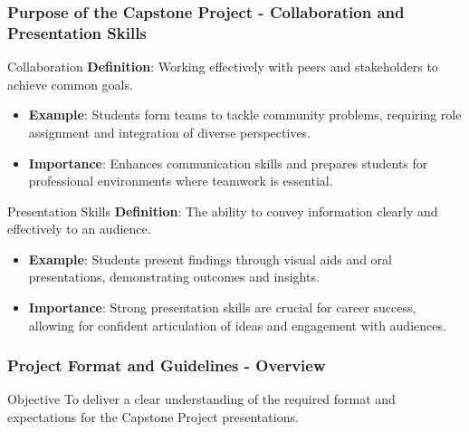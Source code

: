 \documentclass{beamer}
\begin{document}
\begin{frame}[fragile]
    \frametitle{Purpose of the Capstone Project - Collaboration and Presentation Skills}
    \begin{block}{Collaboration}
        \textbf{Definition}: Working effectively with peers and stakeholders to achieve common goals.
    \end{block}
    \begin{itemize}
        \item \textbf{Example}: Students form teams to tackle community problems, requiring role assignment and integration of diverse perspectives.
        \item \textbf{Importance}: Enhances communication skills and prepares students for professional environments where teamwork is essential.
    \end{itemize}
    
    \begin{block}{Presentation Skills}
        \textbf{Definition}: The ability to convey information clearly and effectively to an audience.
    \end{block}
    \begin{itemize}
        \item \textbf{Example}: Students present findings through visual aids and oral presentations, demonstrating outcomes and insights.
        \item \textbf{Importance}: Strong presentation skills are crucial for career success, allowing for confident articulation of ideas and engagement with audiences.
    \end{itemize}
\end{frame}

\begin{frame}[fragile]
    \frametitle{Project Format and Guidelines - Overview}
    \begin{block}{Objective}
        To deliver a clear understanding of the required format and expectations for the Capstone Project presentations.
    \end{block}
\end{frame}
\end{document}

